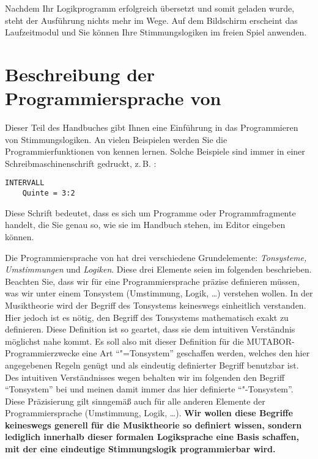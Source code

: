  Nachdem Ihr Logikprogramm erfolgreich übersetzt
und somit geladen wurde, steht der Ausführung nichts mehr im Wege.
Auf dem Bildschirm erscheint das Laufzeitmodul und Sie können Ihre
Stimmungslogiken im freien Spiel anwenden.


%
%


\part[Beschreibung der Programmiersprache]{Beschreibung der
Programmiersprache von \mutabor{}}\label{part:beschr-der-progr}
\label{teilSprache}

 Dieser Teil des Handbuches gibt Ihnen eine
Einführung in das Programmieren von Stimmungslogiken. An vielen
Beispielen werden Sie die Programmierfunktionen von \mutabor{}
kennen lernen.  Solche Beispiele sind immer in einer
Schreibmaschinenschrift gedruckt, z.\,B. :
\begin{verbatim}
INTERVALL
    Quinte = 3:2
\end{verbatim}
Diese Schrift bedeutet, dass es sich um Programme oder
Programmfragmente handelt, die Sie genau so, wie sie im Handbuch
stehen, im Editor eingeben können.

Die Programmiersprache von \mutabor{} hat drei verschiedene
Grundelemente: \emph{Tonsysteme, Umstimmungen\/} und \emph{Logiken\/}.
Diese drei Elemente seien im folgenden beschrieben.  Beachten Sie, dass
wir für eine Programmiersprache präzise definieren müssen, was wir
unter einem Tonsystem (Umstimmung, Logik, \dots) verstehen wollen. In
der Musiktheorie wird der Begriff des Tonsystems
keineswegs einheitlich verstanden. Hier jedoch ist es nötig, den
Begriff des Tonsystems mathematisch exakt zu definieren. Diese
Definition ist so geartet, dass sie dem intuitiven Verständnis
möglichst nahe kommt. Es soll also mit dieser Definition für die
MU\-TA\-BOR-Pro\-gram\-mier\-zwecke eine Art "`\mutabor{}"=Tonsystem"'
geschaffen werden, welches den hier
angegebenen Regeln genügt und als eindeutig definierter Begriff
benutzbar ist. Des intuitiven Verständnisses wegen behalten wir im
folgenden den Begriff "`Tonsystem"' bei und meinen damit immer das
hier definierte "`\mutabor{}"-Tonsystem"'. Diese Präzisierung gilt
sinngemäß auch für alle anderen Elemente der Programmiersprache
(Umstimmung, Logik, \dots).  \textbf{Wir wollen diese Begriffe keineswegs
  generell für die Musiktheorie so definiert wissen, sondern lediglich
  innerhalb dieser formalen Logiksprache eine Basis schaffen, mit der
  eine eindeutige Stimmungslogik programmierbar wird.}

